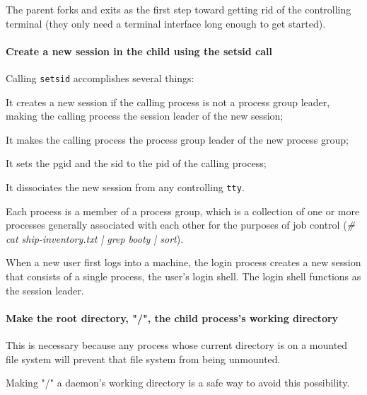 The parent forks and exits as the first step toward getting rid of the controlling terminal (they only need a terminal interface long enough to get started).



\paragraph{\textbf{Create a new session in the child using the setsid call}}
%
Calling \texttt{setsid} accomplishes several things:
\begin{item-c}
%
\item It creates a new session if the calling process is not a process group leader, making the calling process the session leader of the new session;
\item It makes the calling process the process group leader of the new process group;
\item It sets the \gls{pgid} and the \gls{sid} to the \gls{pid} of the calling process;
\item It dissociates the new session from any controlling \texttt{tty}.
%

%
\item Each process is a member of a process group, which is a collection of one or more processes generally associated with each other for the purposes of job control (\textit{\# cat ship-inventory.txt | grep booty | sort}).
\item When a new user first logs into a machine, the login process creates a new session that consists of a single process, the user’s login shell. The login shell functions as the session leader.
%
\end{item-c}

\paragraph{\textbf{Make the root directory, "/", the child process's working directory}}
%
This is necessary because any process whose current directory is on a mounted file system will prevent that file system from being unmounted.

Making "/" a daemon's working directory is a safe way to avoid this possibility.
%

%

